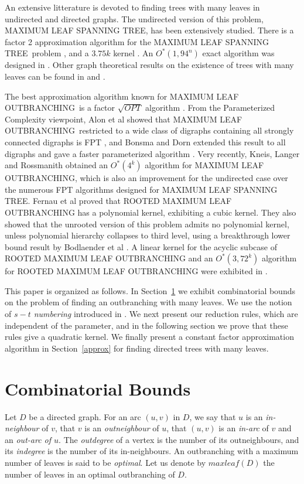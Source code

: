 \documentclass{article}
\def\RMO{R{\footnotesize{OOTED}} M{\footnotesize{AXIMUM}} L{\footnotesize{EAF}} O{\footnotesize{UTBRANCHING}} }
\def\MO{M{\footnotesize{AXIMUM}} L{\footnotesize{EAF}} O{\footnotesize{UTBRANCHING}}}
\def\ML{M{\footnotesize{AXIMUM}} L{\footnotesize{EAF}} S{\footnotesize{PANNING}} T{\footnotesize{REE}}}
\begin{document}
\vspace{12pt}

An extensive litterature is devoted to finding trees with many leaves in undirected and directed graphs. The undirected version of this problem, \ML, has been extensively studied. There is a factor 2 approximation algorithm for the \ML ~problem \cite{SolisMaxLeafApprox}, and a $3.75k$ kernel \cite{EstivillMaxLeaf}. An $O^*(1,94^n)$ exact algorithm was designed in \cite{FominKratschMaxLeaf}. Other graph theoretical results on the existence of trees with many leaves can be found in \cite{SeymourMaxLeaf} and \cite{StorerMaxLeaf}.

The best approximation algorithm known for \MO ~is a factor $\sqrt{OPT}$ algorithm \cite{DrescherMaxLeaf}. From the Parameterized Complexity viewpoint, Alon et al showed that \MO ~restricted to a wide class of digraphs containing all strongly connected digraphs is FPT \cite{AlonMaxLeaf}, and Bonsma and Dorn extended this result to all digraphs and gave a faster parameterized algorithm \cite{BonsmaMaxLeaf}. Very recently, Kneis, Langer and Rossmanith \cite{KneisMaxLeaf} obtained an $O^*(4^k)$ algorithm for \MO, which is also an improvement for the undirected case over the numerous FPT algorithms designed for \ML. Fernau et al \cite{FernauMaxLeaf} proved that \RMO has a polynomial kernel, exhibiting a cubic kernel. They also showed that the unrooted version of this problem admits no polynomial kernel, unless polynomial hierarchy collapses to third level, using a breakthrough lower bound result by Bodlaender et al \cite{NoKernel}. A linear kernel for the acyclic subcase of \RMO and an $O^*(3,72^k)$ algorithm for \RMO were exhibited in \cite{GutinMaxLeaf}.

\vspace{12pt}
This paper is organized as follows. In Section~\ref{sbounds} we exhibit combinatorial bounds on the problem of finding an outbranching with many leaves. We use the notion of \emph{$s-t$ numbering} introduced in \cite{stnum}. We next present our reduction rules, which are independent of the parameter, and in the following section we prove that these rules give a quadratic kernel. We finally present a constant factor approximation algorithm in Section~\ref{approx} for finding directed trees with many leaves.




\section{Combinatorial Bounds}\label{sbounds}
Let $D$ be a directed graph. For an arc $(u,v)$ in $D$, we say that $u$ is an \emph{in-neighbour} of $v$, that $v$ is an \emph{outneighbour} of $u$, that $(u,v)$ is an \emph{in-arc} of $v$ and an \emph{out-arc of $u$}. The \emph{outdegree} of a vertex is the number of its outneighbours, and its \emph{indegree} is the number of its in-neighbours.
An outbranching with a maximum number of leaves is said to be \emph{optimal}. Let us denote by $maxleaf(D)$ the number of leaves in an optimal outbranching of $D$.
\end{document}

